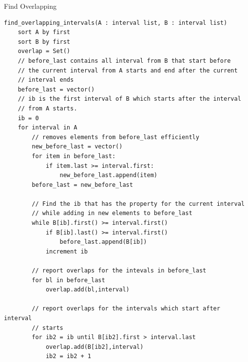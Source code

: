 \documentclass[12pt,twoside]{reedthesis}
\begin{document}
			
			
                    
\begin{algorithm}
    \caption{Find Overlapping}
    \label{algo:findoverlapping}
\begin{verbatim}
find_overlapping_intervals(A : interval list, B : interval list)
    sort A by first
    sort B by first
    overlap = Set()
    // before_last contains all interval from B that start before 
    // the current interval from A starts and end after the current
    // interval ends
    before_last = vector() 
    // ib is the first interval of B which starts after the interval
    // from A starts. 
    ib = 0
    for interval in A
        // removes elements from before_last efficiently
        new_before_last = vector()
        for item in before_last:
            if item.last >= interval.first:
                new_before_last.append(item)
        before_last = new_before_last
        
        // Find the ib that has the property for the current interval
        // while adding in new elements to before_last
        while B[ib].first() >= interval.first()
            if B[ib].last() >= interval.first()
                before_last.append(B[ib])
            increment ib

        // report overlaps for the intevals in before_last
        for bl in before_last
            overlap.add(bl,interval)

        // report overlaps for the intervals which start after interval
        // starts
        for ib2 = ib until B[ib2].first > interval.last
            overlap.add(B[ib2],interval)
            ib2 = ib2 + 1
\end{verbatim}
\end{algorithm}
		
\end{document}
